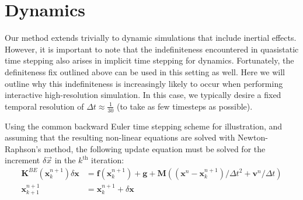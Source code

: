 
\section{Dynamics}
Our method extends trivially to dynamic simulations that include inertial effects. However, it is important to note that the indefiniteness encountered in quasistatic time stepping also arises in implicit time stepping for dynamics. Fortunately, the definiteness fix outlined above can be used in this setting as well. Here we will outline why this indefiniteness is increasingly likely to occur when performing interactive high-resolution simulation. In this case, we typically desire a fixed temporal resolution of $\Delta{t}\approx\frac{1}{30}$ (to take as few timesteps as possible). 

Using the common backward Euler time stepping scheme for illustration, and assuming that the resulting non-linear equations are solved with Newton-Raphson's method, the following update equation must be solved for the increment $\delta\vec{{x}}$ in the $k^\textrm{th}$ iteration:
\begin{align}
\mathbf{K}^{BE}(\mathbf{x}^{n+1}_k)\delta\mathbf{x} &= \mathbf{f}(\mathbf{x}^{n+1}_k) + \mathbf{g}+\mathbf{M}\left(\left(\mathbf{x}^n-\mathbf{x}^{n+1}_k\right)/\Delta t^2 + \mathbf{v}^n/\Delta t\right)\nonumber\\
\mathbf{x}^{n+1}_{k+1}&=\mathbf{x}^{n+1}_k+\delta\mathbf{x}\label{eqn:backward_euler}
\end{align}
